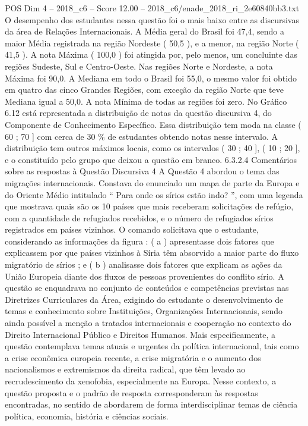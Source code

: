 \begin{textsample}{POS Dim 4 – 2018\_c6 – Score 12.00 – 2018\_c6/enade\_2018\_ri\_2e60840bb3.txt}
O desempenho dos estudantes nessa questão foi o mais baixo entre as discursivas da área de Relações Internacionais.
A Média geral do Brasil foi 47,4, sendo a maior Média registrada na região Nordeste ( 50,5 ), e a menor, na região Norte ( 41,5 ).
A nota Máxima ( 100,0 ) foi atingida por, pelo menos, um concluinte das regiões Sudeste, Sul e Centro-Oeste.
Nas regiões Norte e Nordeste, a nota Máxima foi 90,0.
A Mediana em todo o Brasil foi 55,0, o mesmo valor foi obtido em quatro das cinco Grandes Regiões, com exceção da região Norte que teve Mediana igual a 50,0.
A nota Mínima de todas as regiões foi zero.
No Gráfico 6.12 está representada a distribuição de notas da questão discursiva 4, do Componente de Conhecimento Específico.
Essa distribuição tem moda na classe ( 60 ; 70 ] com cerca de 30 \% de estudantes obtendo notas nesse intervalo.
A distribuição tem outros máximos locais, como os intervalos ( 30 ; 40 ], ( 10 ; 20 ], e o constituído pelo grupo que deixou a questão em branco. 6.3.2.4 Comentários sobre as respostas à Questão Discursiva 4 A Questão 4 abordou o tema das migrações internacionais.
Constava do enunciado um mapa de parte da Europa e do Oriente Médio intitulado “ Para onde os sírios estão indo? ”, com uma legenda que mostrava quais são os 10 países que mais receberam solicitações de refúgio, com a quantidade de refugiados recebidos, e o número de refugiados sírios registrados em países vizinhos.
O comando solicitava que o estudante, considerando as informações da figura : ( a ) apresentasse dois fatores que explicassem por que países vizinhos à Síria têm absorvido a maior parte do fluxo migratório de sírios ; e ( b ) analisasse dois fatores que explicam as ações da União Europeia diante dos fluxos de pessoas provenientes do conflito sírio.
A questão se enquadrava no conjunto de conteúdos e competências previstas nas Diretrizes Curriculares da Área, exigindo do estudante o desenvolvimento de temas e conhecimento sobre Instituições, Organizações Internacionais, sendo ainda possível a menção a tratados internacionais e cooperação no contexto do Direito Internacional Público e Direitos Humanos.
Mais especificamente, a questão contemplava temas atuais e urgentes da política internacional, tais como a crise econômica europeia recente, a crise migratória e o aumento dos nacionalismos e extremismos da direita radical, que têm levado ao recrudescimento da xenofobia, especialmente na Europa.
Nesse contexto, a questão proposta e o padrão de resposta corresponderam às respostas encontradas, no sentido de abordarem de forma interdisciplinar temas de ciência política, economia, história e ciências sociais.

\end{textsample}
